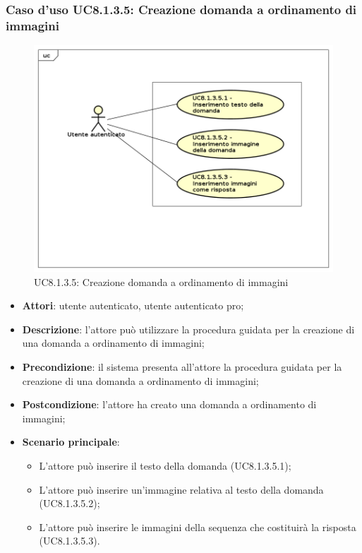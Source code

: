 \subsubsection{Caso d'uso UC8.1.3.5: Creazione domanda a ordinamento di immagini}
\label{UC8.1.3.5}
	\begin{figure}[h]
		\centering
			\includegraphics[scale=0.45,keepaspectratio]{UML/UC8_1_3_5.png}
		\caption{UC8.1.3.5: Creazione domanda a ordinamento di immagini}
	\end{figure}
	\FloatBarrier
\begin{itemize}
	\item\textbf{Attori}: utente autenticato, utente autenticato pro;
	\item\textbf{Descrizione}: l'attore può utilizzare la procedura guidata per la creazione di una domanda a ordinamento di immagini;
	\item\textbf{Precondizione}: il sistema presenta all'attore la procedura guidata per la creazione di una domanda a ordinamento di immagini; 
	\item \textbf{Postcondizione}: l'attore ha creato una domanda a ordinamento di immagini;
	\item\textbf{Scenario principale}:
	\begin{itemize}
		\item L'attore può inserire il testo della domanda (UC8.1.3.5.1);
		\item L'attore può inserire un'immagine relativa al testo della domanda (UC8.1.3.5.2);
		\item L'attore può inserire le immagini della sequenza che costituirà la risposta (UC8.1.3.5.3).
	\end{itemize}
\end{itemize}

